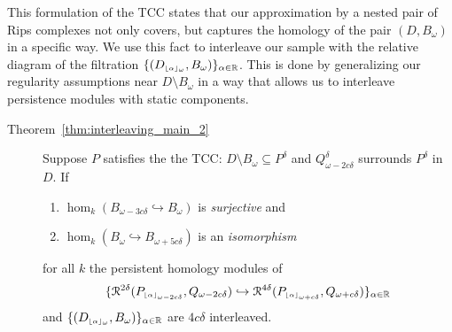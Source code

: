This formulation of the TCC states that our approximation by a nested pair of Rips complexes not only covers, but captures the homology of the pair $(D,B_\omega)$ in a specific way.
We use this fact to interleave our sample with the relative diagram of the filtration $\{(D_{\scriptscriptstyle \lfloor\alpha\rfloor_{\omega}}, B_\omega)\}_{\alpha\in\mathbb{R}}$.
This is done by generalizing our regularity assumptions near $D\setminus B_\omega$ in a way that allows us to interleave persistence modules with static components.%

\begin{description}
  \item[Theorem~\ref{thm:interleaving_main_2}] Suppose $P$ satisfies the the TCC: $D\setminus B_\omega\subseteq P^\delta$ and  $Q_{\omega-2c\delta}^\delta$ surrounds $P^\delta$ in $D$.
    If
    \begin{enumerate}[label=\Roman*.]
      \item $\hom_k(B_{\omega-3c\delta}\hookrightarrow B_\omega)$ is \emph{surjective} and
      \item $\hom_k(B_\omega\hookrightarrow B_{\omega+5c\delta})$ is an \emph{isomorphism}
    \end{enumerate}
    for all $k$ the persistent homology modules of
    \[ \{\mathcal{R}^{2\delta}(P_{\scriptscriptstyle \lfloor\alpha\rfloor_{\omega-2c\delta}}, Q_{\omega-2c\delta})\hookrightarrow \mathcal{R}^{4\delta}(P_{\scriptscriptstyle \lfloor\alpha\rfloor_{\omega+c\delta}}, Q_{\omega+c\delta})\}_{\alpha\in\mathbb{R}}\]
    and $\{(D_{\scriptscriptstyle \lfloor\alpha\rfloor_{\omega}}, B_\omega)\}_{\alpha\in\mathbb{R}}$ are $4c\delta$ interleaved.
\end{description}

